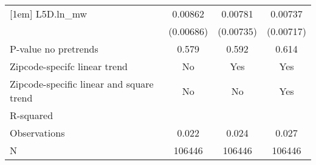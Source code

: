 {\begin{tabular}{l*{3}{c}}
[1em]
L5D.ln\_mw &  0.00862         &  0.00781         &  0.00737         \\
          &(0.00686)         &(0.00735)         &(0.00717)         \\
\hline
P-value no pretrends&    0.579         &    0.592         &    0.614         \\
Zipcode-specifc linear trend&       No         &      Yes         &      Yes         \\
Zipcode-specific linear and square trend&       No         &       No         &      Yes         \\
R-squared &                  &                  &                  \\
Observations&    0.022         &    0.024         &    0.027         \\
N         &   106446         &   106446         &   106446         \\
\hline\hline
\end{tabular}
}
